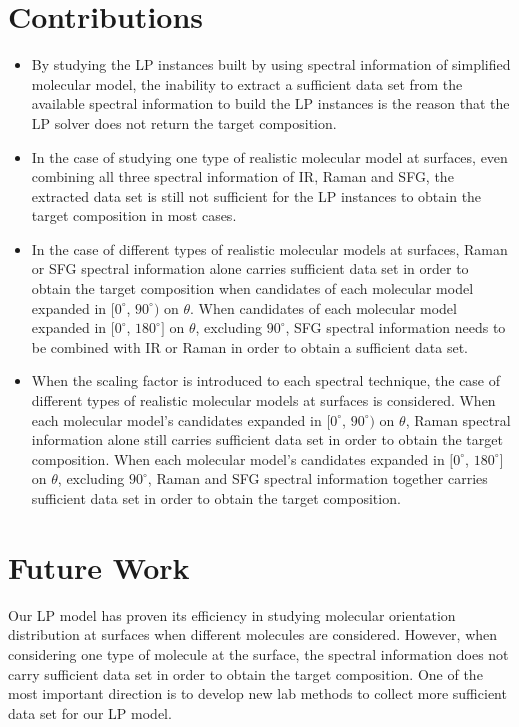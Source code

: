 \section{Contributions}
\begin{itemize}
  \item By studying the LP instances built by using spectral information of simplified molecular model, the inability to extract a sufficient data set from the available spectral information to build the LP instances is the reason that the LP solver does not return the target composition.
  \item In the case of studying one type of realistic molecular model at surfaces, even combining all three spectral information of IR, Raman and SFG, the extracted data set is still not sufficient for the LP instances to obtain the target composition in most cases. 
  \item In the case of different types of realistic molecular models at surfaces, Raman or SFG spectral information alone carries sufficient data set in order to obtain the target composition when candidates of each molecular model expanded in $[0^{\circ}$, $90^{\circ})$ on $\theta$. When candidates of each molecular model expanded in $[0^{\circ}$, $180^{\circ}]$ on $\theta$, excluding $90^{\circ}$, SFG spectral information needs to be combined with IR or Raman in order to obtain a sufficient data set.
  \item When the scaling factor is introduced to each spectral technique, the case of different types of realistic molecular models at surfaces is considered. When each molecular model's candidates expanded in $[0^{\circ}$, $90^{\circ})$ on $\theta$, Raman spectral information alone still carries sufficient data set in order to obtain the target composition. When each molecular model's candidates expanded in $[0^{\circ}$, $180^{\circ}]$ on $\theta$, excluding $90^{\circ}$, Raman and SFG spectral information together carries sufficient data set in order to obtain the target composition.
\end{itemize}

\section{Future Work}
Our LP model has proven its efficiency in studying molecular orientation distribution at surfaces when different molecules are considered. However, when considering one type of molecule at the surface, the spectral information does not carry sufficient data set in order to obtain the target composition. One of the most important direction is to develop new lab methods to collect more sufficient data set for our LP model.

